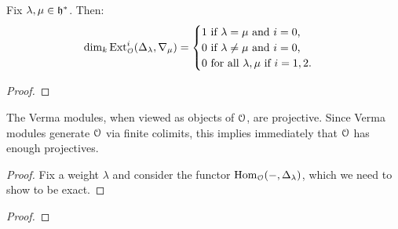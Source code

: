         \begin{lemma} \label{lemma: cohomology_of_verma_modules}
            Fix $\lambda, \mu \in \mathfrak{h}^*$. Then:
                $$
                    \dim_k \mathrm{Ext}^i_{\mathcal{O}}(\Delta_{\lambda}, \nabla_{\mu}) =
                    \begin{cases}
                        \text{$1$ if $\lambda = \mu$ and $i = 0$,}
                        \\
                        \text{$0$ if $\lambda \not = \mu$ and $i = 0$,}
                        \\
                        \text{$0$ for all $\lambda, \mu$ if $i = 1, 2$.}
                    \end{cases}
                $$
        \end{lemma}
            \begin{proof}
                
            \end{proof}
        \begin{proposition} \label{prop: category_O_has_enough_projective}
            The Verma modules, when viewed as objects of $\mathcal{O}$, are projective. Since Verma modules generate $\mathcal{O}$ via finite colimits, this implies immediately that $\mathcal{O}$ has enough projectives.
        \end{proposition}
            \begin{proof}
                Fix a weight $\lambda$ and consider the functor $\mathrm{Hom}_{\mathcal{O}}(-, \Delta_{\lambda})$, which we need to show to be exact. 
            \end{proof}
        
        \begin{theorem} \label{theorem: BGG_reciprocity}
            
        \end{theorem}
            \begin{proof}
                
            \end{proof}

